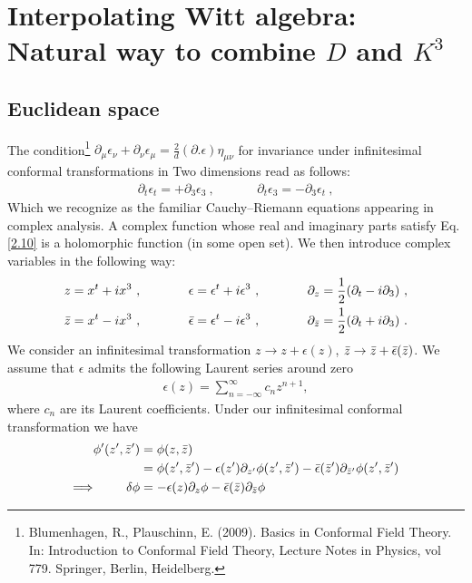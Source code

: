 \documentclass[]{article}
\numberwithin{equation}{section}
\begin{document}
{{\section{Interpolating  Witt algebra: Natural way to combine $D$ and $K^3$}
\subsection{Euclidean space}
The condition\footnote{Blumenhagen, R., Plauschinn, E. (2009). Basics in Conformal Field Theory. In: Introduction to Conformal Field Theory, Lecture Notes in Physics, vol 779. Springer, Berlin, Heidelberg.} $\boxed{\partial_{\mu}\epsilon_{\nu}+\partial_{\nu}\epsilon_{\mu}=\frac{2}{d}(\partial.\epsilon)\eta_{\mu\nu}}$ for invariance under infinitesimal conformal transformations in
Two dimensions read as follows:
\begin{align}
    \partial_t\epsilon_t=+\partial_3\epsilon_3~,~~~~~~~~~~~~~~~\partial_t\epsilon_3=-\partial_3\epsilon_t~,\label{2.10}
\end{align}
Which we recognize as the familiar Cauchy–Riemann equations appearing in complex analysis. A complex function whose real and imaginary parts satisfy Eq. \eqref{2.10} is a holomorphic function (in some open set). We then introduce complex variables in the following way:
\begin{align}
    z=x^t+ix^3~,~~~~~~~~~~~\epsilon&=\epsilon^t+i\epsilon^3~,~~~~~~~~~~~\partial_z=\frac{1}{2}(\partial_t-i\partial_3)~,\\
    \Bar{z}=x^t-ix^3~,~~~~~~~~~~~\Bar{\epsilon}&=\epsilon^t-i\epsilon^3~,~~~~~~~~~~~\partial_{\Bar{z}}=\frac{1}{2}(\partial_t+i\partial_3)~.
\end{align}
We consider an infinitesimal transformation $z\rightarrow z+\epsilon(z)$, $\Bar{z}\rightarrow \Bar{z}+\Bar{\epsilon}(\Bar{z})$. We assume that $\epsilon$ admits the following Laurent series around zero
\begin{align}
    \epsilon(z)=\sum_{n=-\infty}^{\infty}c_nz^{n+1},
\end{align}
where $c_n$ are its Laurent coefficients.  Under our infinitesimal conformal
transformation we have
\begin{align}
    \phi'(z',\Bar{z}')&=\phi(z,\Bar{z})\nonumber\\
    &=\phi(z',\Bar{z}')-\epsilon(z')\partial_{z'}\phi(z',\Bar{z}')-\Bar{\epsilon}(\Bar{z}')\partial_{\Bar{z}'}\phi(z',\Bar{z}')\\
    \Longrightarrow~~~~~~~\delta\phi&=-\epsilon(z)\partial_z\phi-\Bar{\epsilon}(\Bar{z})\partial_{\Bar{z}}\phi\nonumber\\

\end{align}}}
\end{document}
